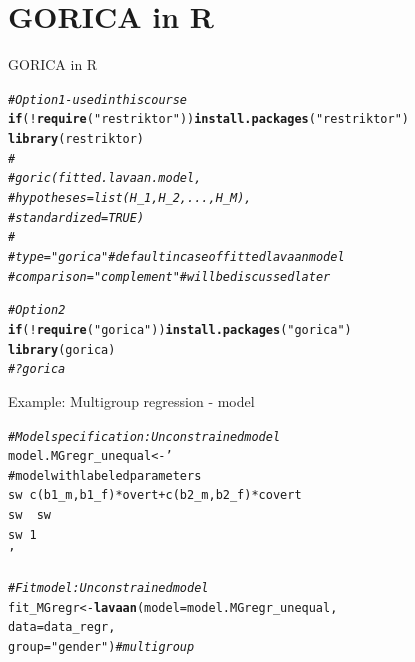 \documentclass[10pt]{beamer}\usepackage[]{graphicx}\usepackage[]{xcolor}
\makeatletter
\newcommand{\hlstr}[1]{\textcolor[rgb]{0.192,0.494,0.8}{#1}}%
\newcommand{\hlcom}[1]{\textcolor[rgb]{0.678,0.584,0.686}{\textit{#1}}}%
\newcommand{\hlopt}[1]{\textcolor[rgb]{0,0,0}{#1}}%
\newcommand{\hlstd}[1]{\textcolor[rgb]{0.345,0.345,0.345}{#1}}%
\newcommand{\hlkwa}[1]{\textcolor[rgb]{0.161,0.373,0.58}{\textbf{#1}}}%
\newcommand{\hlkwb}[1]{\textcolor[rgb]{0.69,0.353,0.396}{#1}}%
\newcommand{\hlkwc}[1]{\textcolor[rgb]{0.333,0.667,0.333}{#1}}%
\newcommand{\hlkwd}[1]{\textcolor[rgb]{0.737,0.353,0.396}{\textbf{#1}}}%
\newenvironment{kframe}{%
 \def\at@end@of@kframe{}%
 \ifinner\ifhmode%
  \def\at@end@of@kframe{\end{minipage}}%
  \begin{minipage}{\columnwidth}%
 \fi\fi%
 \def\FrameCommand##1{\hskip\@totalleftmargin \hskip-\fboxsep
 \colorbox{shadecolor}{##1}\hskip-\fboxsep
     \hskip-\linewidth \hskip-\@totalleftmargin \hskip\columnwidth}%
 \MakeFramed {\advance\hsize-\width
   \@totalleftmargin\z@ \linewidth\hsize
   \@setminipage}}%
 {\par\unskip\endMakeFramed%
 \at@end@of@kframe}
\newenvironment{knitrout}{}{} %
\makeatother
\begin{document}
\section{GORICA in R}
%
%
\begin{frame}[fragile]{GORICA in R}

\begin{knitrout}
\color{fgcolor}\begin{kframe}
\begin{alltt}
\hlcom{# Option 1 - used in this course}
\hlkwa{if} \hlstd{(}\hlopt{!}\hlkwd{require}\hlstd{(}\hlstr{"restriktor"}\hlstd{))} \hlkwd{install.packages}\hlstd{(}\hlstr{"restriktor"}\hlstd{)}
\hlkwd{library}\hlstd{(restriktor)}
\hlcom{#}
\hlcom{#goric(fitted.lavaan.model, }
\hlcom{#      hypotheses = list(H_1, H_2, ..., H_M),}
\hlcom{#      standardized = TRUE)}
\hlcom{#}
\hlcom{#type = "gorica" # default in case of fitted lavaan model}
\hlcom{#comparison = "complement" # will be discussed later}

\hlcom{# Option 2}
\hlkwa{if} \hlstd{(}\hlopt{!}\hlkwd{require}\hlstd{(}\hlstr{"gorica"}\hlstd{))} \hlkwd{install.packages}\hlstd{(}\hlstr{"gorica"}\hlstd{)}
\hlkwd{library}\hlstd{(gorica)}
\hlcom{#?gorica}
\end{alltt}
\end{kframe}
\end{knitrout}
          
\end{frame}
%
\begin{frame}[fragile]{Example: Multigroup regression - model}

\begin{knitrout}
\color{fgcolor}\begin{kframe}
\begin{alltt}
\hlcom{# Model specification: Unconstrained model}
\hlstd{model.MGregr_unequal} \hlkwb{<-} \hlstr{'
  # model with labeled parameters
  sw ~ c(b1_m,b1_f)*overt + c(b2_m,b2_f)*covert 
  sw ~~ sw                                      
  sw ~ 1                                        
'}

\hlcom{# Fit model: Unconstrained model}
\hlstd{fit_MGregr} \hlkwb{<-} \hlkwd{lavaan}\hlstd{(}\hlkwc{model} \hlstd{= model.MGregr_unequal,}
                    \hlkwc{data} \hlstd{= data_regr,}
                    \hlkwc{group} \hlstd{=} \hlstr{"gender"}\hlstd{)} \hlcom{# multigroup}
\end{alltt}
\end{kframe}
\end{knitrout}
          
\end{frame}
\end{document}

